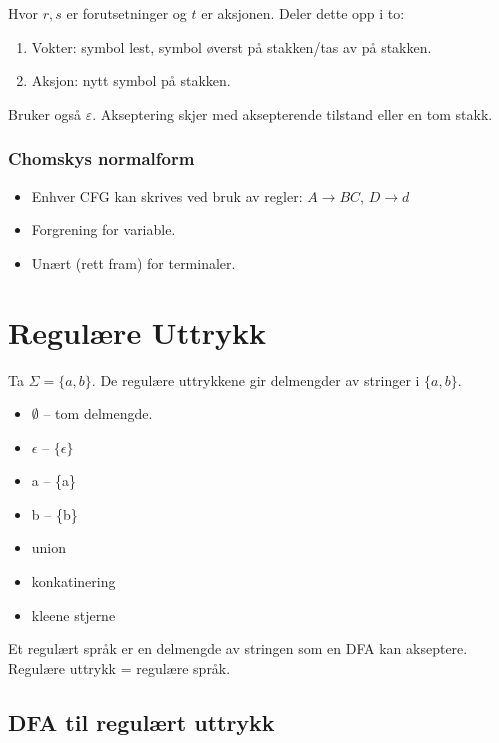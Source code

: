 \documentclass[11pt,a4paper]{article}
\begin{document}
Hvor $r,s$ er forutsetninger og $t$ er aksjonen. Deler dette opp i to:
\begin{enumerate}
\item{Vokter: symbol lest, symbol øverst på stakken/tas av på stakken.}
\item{Aksjon: nytt symbol på stakken.}
\end{enumerate}

Bruker også $\varepsilon$. Akseptering skjer med aksepterende tilstand eller en tom stakk.

\subsubsection{Chomskys normalform}
\begin{itemize}
\item{Enhver CFG kan skrives ved bruk av regler: $A \longrightarrow BC$, $D \longrightarrow d$}
\item{Forgrening for variable.}
\item{Unært (rett fram) for terminaler.}
\end{itemize}

\section{Regulære Uttrykk}
Ta $\Sigma = \{a,b\}$. De regulære uttrykkene gir delmengder av stringer i $\{a, b\}$.
\begin{itemize}
\item{$\emptyset$ -- tom delmengde.}
\item{$\epsilon$ -- $\{\epsilon\}$}
\item{a -- \{a\}}
\item{b -- \{b\}}
\item{union}
\item{konkatinering}
\item{kleene stjerne}
\end{itemize}

Et regulært språk er en delmengde av stringen som en DFA kan akseptere. Regulære uttrykk = regulære språk.

\subsection{DFA til regulært uttrykk}

\begin{figure}[h!]
\centering
{}
\end{figure}
\end{document}
